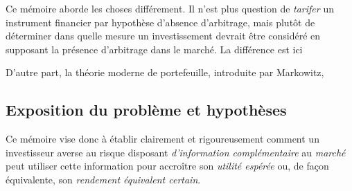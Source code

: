 


Ce mémoire aborde les choses différement. Il n'est plus question de \textit{tarifer} un
instrument financier par hypothèse d'absence d'arbitrage, mais plutôt de déterminer dans
quelle mesure un investissement devrait être considéré en supposant la présence
d'arbitrage dans le marché. La différence est ici 

D'autre part, la théorie moderne de portefeuille, introduite par Markowitz, 



\subsection{Exposition du problème et hypothèses}

Ce mémoire vise donc à établir clairement et rigoureusement comment un investisseur averse
au risque disposant \textit{d'information complémentaire} au \textit{marché} peut utiliser
cette information pour accroître son \textit{utilité espérée} ou, de façon équivalente,
son \textit{rendement équivalent certain}.

